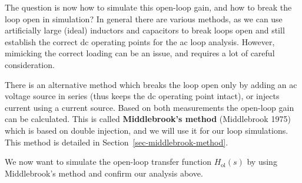 \documentclass[
  a4paper,
  DIV=11,
  numbers=noendperiod]{scrartcl}
\begin{document}
The question is now how to simulate this open-loop gain, and how to
break the loop open in simulation? In general there are various methods,
as we can use artificially large (ideal) inductors and capacitors to
break loops open and still establish the correct dc operating points for
the ac loop analysis. However, mimicking the correct loading can be an
issue, and requires a lot of careful consideration.

There is an alternative method which breaks the loop open only by adding
an ac voltage source in series (thus keeps the dc operating point
intact), or injects current using a current source. Based on both
measurements the open-loop gain can be calculated. This is called
\textbf{Middlebrook's method} (Middlebrook 1975) which is based on
double injection, and we will use it for our loop simulations. This
method is detailed in Section~\ref{sec-middlebrook-method}.

We now want to simulate the open-loop transfer function
\(H_\mathrm{ol}(s)\) by using Middlebrook's method and confirm our
analysis above.
\end{document}
